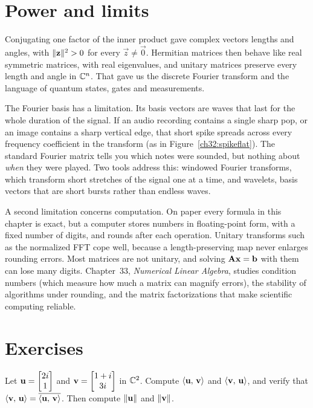 \section{Power and limits}

Conjugating one factor of the inner product gave complex vectors lengths and
angles, with $\lVert\mathbf{z}\rVert^2 > 0$ for every $\vec z \ne \vec 0$. Hermitian matrices
then behave like real symmetric matrices, with real eigenvalues, and unitary
matrices preserve every length and angle in $\mathbb{C}^n$. That gave us the discrete
Fourier transform and the language of quantum states, gates and measurements.

The Fourier basis has a limitation. Its basis vectors are waves that last for the
whole duration of the signal.
If an audio recording contains a single sharp pop, or an image contains a sharp
vertical edge, that short spike spreads across every
frequency coefficient in the transform (as in Figure~\ref{ch32:spikeflat}). The standard Fourier matrix tells you
which notes were sounded, but nothing about \emph{when} they
were played. Two tools address this: windowed Fourier transforms, which
transform short stretches of the signal one at a time, and wavelets, basis
vectors that are short bursts rather than endless waves.

A second limitation concerns computation. On paper every formula in this chapter
is exact, but a computer stores numbers in floating-point form, with a fixed
number of digits, and rounds after each operation. Unitary transforms such as the
normalized FFT cope well, because a length-preserving map never enlarges rounding
errors. Most matrices are not unitary, and solving $\mathbf{A}\mathbf{x}=\mathbf{b}$ with them
can lose many digits. Chapter~33, \emph{Numerical Linear Algebra}, studies
condition numbers (which measure how much a matrix can magnify errors), the
stability of algorithms under rounding, and the matrix factorizations that make
scientific computing reliable.

\section{Exercises}

\begin{exercise}\label{ch32:ex-innerprod}
Let $\mathbf{u}=\begin{bmatrix}2i\\1\end{bmatrix}$ and $\mathbf{v}=\begin{bmatrix}1+i\\3i\end{bmatrix}$ in $\mathbb{C}^2$. Compute
$\langle \mathbf{u},\, \mathbf{v} \rangle$ and $\langle \mathbf{v},\, \mathbf{u} \rangle$, and verify that
$\langle \mathbf{v},\, \mathbf{u} \rangle=\overline{\langle \mathbf{u},\, \mathbf{v} \rangle}$. Then compute
$\lVert\mathbf{u}\rVert$ and $\lVert\mathbf{v}\rVert$.
\end{exercise}

